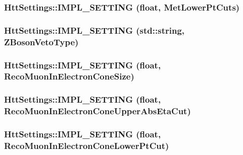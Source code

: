 \label{classHttSettings_a2939619972a67313042065bb11281e49}
\hypertarget{classHttSettings_a4bc5e270180cfed1780f508edc312d7e}{
\subsubsection[{IMPL\_\-SETTING}]{\setlength{\rightskip}{0pt plus 5cm}HttSettings::IMPL\_\-SETTING (float, \/  MetLowerPtCuts)}}
\label{classHttSettings_a4bc5e270180cfed1780f508edc312d7e}
\hypertarget{classHttSettings_a0f3c47cc748cad7c207b7efa7a3ff978}{
\subsubsection[{IMPL\_\-SETTING}]{\setlength{\rightskip}{0pt plus 5cm}HttSettings::IMPL\_\-SETTING (std::string, \/  ZBosonVetoType)}}
\label{classHttSettings_a0f3c47cc748cad7c207b7efa7a3ff978}
\hypertarget{classHttSettings_aa5139267789fb86b9c690d26df803901}{
\subsubsection[{IMPL\_\-SETTING}]{\setlength{\rightskip}{0pt plus 5cm}HttSettings::IMPL\_\-SETTING (float, \/  RecoMuonInElectronConeSize)}}
\label{classHttSettings_aa5139267789fb86b9c690d26df803901}
\hypertarget{classHttSettings_a40db97084ea0a152fe85fd95b5f54cb6}{
\subsubsection[{IMPL\_\-SETTING}]{\setlength{\rightskip}{0pt plus 5cm}HttSettings::IMPL\_\-SETTING (float, \/  RecoMuonInElectronConeUpperAbsEtaCut)}}
\label{classHttSettings_a40db97084ea0a152fe85fd95b5f54cb6}
\hypertarget{classHttSettings_a4b994d80181858ca1b197d37322e1126}{
\subsubsection[{IMPL\_\-SETTING}]{\setlength{\rightskip}{0pt plus 5cm}HttSettings::IMPL\_\-SETTING (float, \/  RecoMuonInElectronConeLowerPtCut)}}
